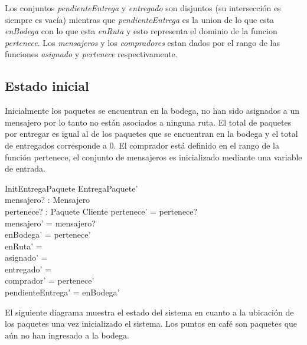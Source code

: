 \documentclass[12pt,a4paper,table]{article}
\begin{document}
Los conjuntos \textit{pendienteEntrega} y \textit{entregado} son disjuntos (su intersección es siempre es vacía) mientras que \textit{pendienteEntrega} es la union de lo que esta \textit{enBodega} con lo que esta \textit{enRuta} y esto representa el dominio de la funcion \textit{pertenece}. Los \textit{mensajeros} y los \textit{compradores} estan dados por el rango de las funciones \textit{asignado} y \textit{pertenece} respectivamente.

\subsection{Estado inicial}

Inicialmente los paquetes se encuentran en la bodega, no han sido asignados a un mensajero por lo tanto no están asociados a ninguna ruta. El total de paquetes por entregar es igual al de los paquetes que se encuentran en la bodega y el total de entregados corresponde a 0. El comprador está definido en el rango de la función pertenece, el conjunto de mensajeros es inicializado mediante una variable de entrada.

\begin{schema}{InitEntregaPaquete}
EntregaPaquete'\\
mensajero? : \power Mensajero\\
pertenece? : Paquete \pfun Cliente
\where
pertenece' = pertenece?\\
mensajero' = mensajero?\\
enBodega' = \dom pertenece'\\
enRuta' = \emptyset\\
asignado' = \emptyset\\
entregado' = \emptyset\\
comprador' = \ran pertenece'\\
pendienteEntrega' = enBodega'
\end{schema}

El siguiente diagrama muestra el estado del sistema en cuanto a la ubicación de los paquetes una vez inicializado el sistema. Los puntos en café son paquetes que aún no han ingresado a la bodega.
\end{document}
